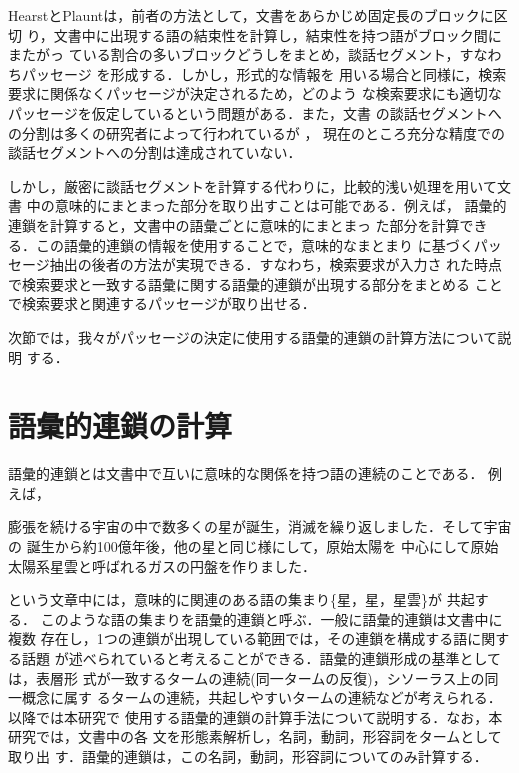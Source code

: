 HearstとPlauntは，前者の方法として，文書をあらかじめ固定長のブロックに区切
り，文書中に出現する語の結束性を計算し，結束性を持つ語がブロック間にまたがっ
ている割合の多いブロックどうしをまとめ，談話セグメント，すなわちパッセージ
を形成する\cite{Hearst:93}．しかし，形式的な情報を
用いる場合と同様に，検索要求に関係なくパッセージが決定されるため，どのよう
な検索要求にも適切なパッセージを仮定しているという問題がある．また，文書
の談話セグメントへの分割は多くの研究者によって行われているが
\cite{Kozima:93,Hearst:94,Litman:95,Mochizuki:98}，
現在のところ充分な精度での談話セグメントへの分割は達成されていない．

しかし，厳密に談話セグメントを計算する代わりに，比較的浅い処理を用いて文書
中の意味的にまとまった部分を取り出すことは可能である．例えば，
語彙的連鎖\cite{Morris:91}を計算すると，文書中の語彙ごとに意味的にまとまっ
た部分を計算できる．この語彙的連鎖の情報を使用することで，意味的なまとまり
に基づくパッセージ抽出の後者の方法が実現できる．すなわち，検索要求が入力さ
れた時点で検索要求と一致する語彙に関する語彙的連鎖が出現する部分をまとめる
ことで検索要求と関連するパッセージが取り出せる．

次節では，我々がパッセージの決定に使用する語彙的連鎖の計算方法について説明
する．

\section{語彙的連鎖の計算}\label{sec:lexchain}

語彙的連鎖とは文書中で互いに意味的な関係を持つ語の連続のことである．
例えば，

\vspace*{1em}
膨張を続ける宇宙の中で数多くの星が誕生，消滅を繰り返しました．そして宇宙の
誕生から約100億年後，他の星と同じ様にして，原始太陽を
中心にして原始太陽系星雲と呼ばれるガスの円盤を作りました．

\vspace*{1em}
\noindent という文章中には，意味的に関連のある語の集まり\{星，星，星雲\}が
共起する．
このような語の集まりを語彙的連鎖と呼ぶ．一般に語彙的連鎖は文書中に複数
存在し，1つの連鎖が出現している範囲では，その連鎖を構成する語に関する話題
が述べられていると考えることができる．語彙的連鎖形成の基準としては，表層形
式が一致するタームの連続(同一タームの反復)，シソーラス上の同一概念に属す
るタームの連続，共起しやすいタームの連続などが考えられる．以降では本研究で
使用する語彙的連鎖の計算手法について説明する．なお，本研究では，文書中の各
文を形態素解析し\cite{Chasen:97j}，名詞，動詞，形容詞をタームとして取り出
す．語彙的連鎖は，この名詞，動詞，形容詞についてのみ計算する．

